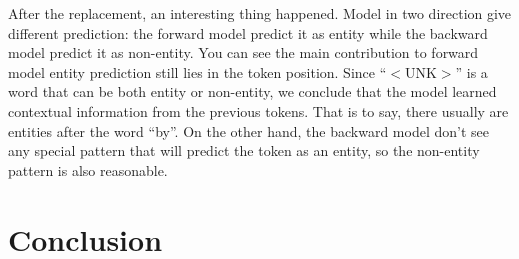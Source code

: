 \documentclass{article}
\begin{document}
After the replacement, an interesting thing happened. Model in two direction give different prediction: the forward model predict it as entity while the backward model predict it as non-entity. You can see the main contribution to forward model entity prediction still lies in the token position. Since ``$<$UNK$>$'' is a word that can be both entity or non-entity, we conclude that the model learned contextual information from the previous tokens. That is to say, there usually are entities after the word 
``by''. On the other hand, the backward model don't see any special pattern that will predict the token as an entity, so the non-entity pattern is also reasonable. 


\section{Conclusion}


\nocite{*}




\end{document}
